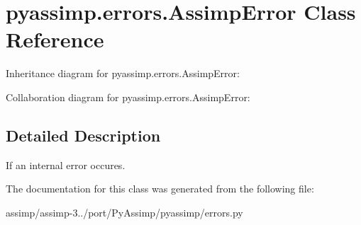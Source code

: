 \hypertarget{classpyassimp_1_1errors_1_1_assimp_error}{\section{pyassimp.\+errors.\+Assimp\+Error Class Reference}
\label{classpyassimp_1_1errors_1_1_assimp_error}
}


Inheritance diagram for pyassimp.\+errors.\+Assimp\+Error\+:


Collaboration diagram for pyassimp.\+errors.\+Assimp\+Error\+:


\subsection{Detailed Description}
\begin{DoxyVerb}If an internal error occures.
\end{DoxyVerb}
 

The documentation for this class was generated from the following file\+:\begin{DoxyCompactItemize}
\item 
assimp/assimp-\/3../port/\+Py\+Assimp/pyassimp/errors.\+py\end{DoxyCompactItemize}
